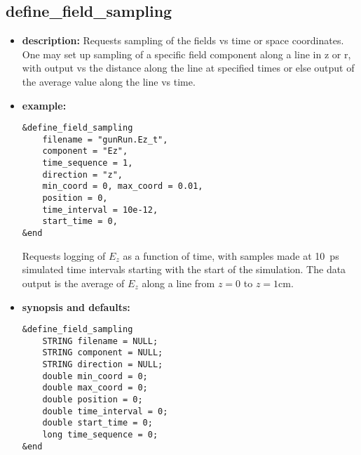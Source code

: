 %
\newpage

\subsection{define\_field\_sampling}

\begin{itemize}

\item {\bf description:}
Requests sampling of the fields vs time or space coordinates.  One may
set up sampling of a specific field component along a line in z or r,
with output vs the distance along the line at specified times or else
output of the average value along the line vs time.

\item {\bf example:} 
\begin{verbatim}
&define_field_sampling
    filename = "gunRun.Ez_t",
    component = "Ez",
    time_sequence = 1,
    direction = "z",
    min_coord = 0, max_coord = 0.01,
    position = 0,
    time_interval = 10e-12,
    start_time = 0,
&end
\end{verbatim}
Requests logging of $E_z$ as a function of time, with samples made at
10~ps simulated time intervals starting with the start of the
simulation.  The data output is the average of $E_z$ along a
line from $z=0$ to $z=1$cm.

\item {\bf synopsis and defaults:} 
\begin{verbatim}
&define_field_sampling
    STRING filename = NULL;
    STRING component = NULL;
    STRING direction = NULL;
    double min_coord = 0;
    double max_coord = 0;
    double position = 0;
    double time_interval = 0;
    double start_time = 0;
    long time_sequence = 0;
&end
\end{verbatim}


\end{itemize}
